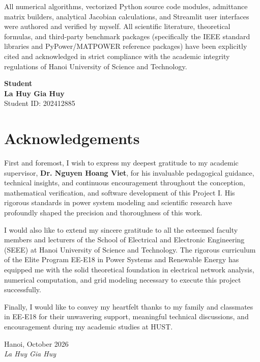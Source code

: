 \documentclass[12pt,a4paper,oneside]{report}
\begin{document}
All numerical algorithms, vectorized Python source code modules, admittance matrix builders, analytical Jacobian calculations, and Streamlit user interfaces were authored and verified by myself. All scientific literature, theoretical formulas, and third-party benchmark packages (specifically the IEEE standard libraries and PyPower/MATPOWER reference packages) have been explicitly cited and acknowledged in strict compliance with the academic integrity regulations of Hanoi University of Science and Technology.

\vspace{35pt}
\begin{flushright}
    \textbf{Student}\\[45pt]
    \textbf{La Huy Gia Huy}\\
    Student ID: 202412885
\end{flushright}

\clearpage

\chapter*{Acknowledgements}
First and foremost, I wish to express my deepest gratitude to my academic supervisor, \textbf{Dr. Nguyen Hoang Viet}, for his invaluable pedagogical guidance, technical insights, and continuous encouragement throughout the conception, mathematical verification, and software development of this Project I. His rigorous standards in power system modeling and scientific research have profoundly shaped the precision and thoroughness of this work.

I would also like to extend my sincere gratitude to all the esteemed faculty members and lecturers of the School of Electrical and Electronic Engineering (SEEE) at Hanoi University of Science and Technology. The rigorous curriculum of the Elite Program EE-E18 in Power Systems and Renewable Energy has equipped me with the solid theoretical foundation in electrical network analysis, numerical computation, and grid modeling necessary to execute this project successfully.

Finally, I would like to convey my heartfelt thanks to my family and classmates in EE-E18 for their unwavering support, meaningful technical discussions, and encouragement during my academic studies at HUST.

\vspace{25pt}
\begin{flushright}
    Hanoi, October 2026\\
    \textit{La Huy Gia Huy}
\end{flushright}
\end{document}
